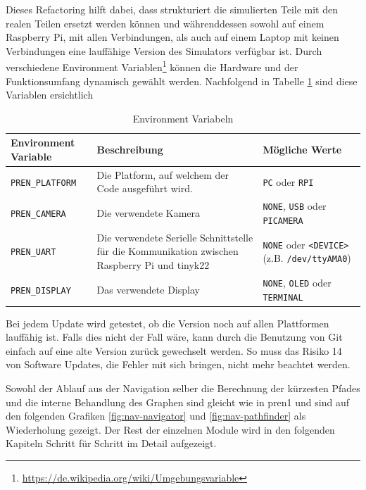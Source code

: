 Dieses Refactoring hilft dabei, dass strukturiert die simulierten Teile mit den realen Teilen ersetzt werden können und währenddessen sowohl auf einem Raspberry Pi, mit allen Verbindungen, als auch auf einem Laptop mit keinen Verbindungen eine lauffähige Version des Simulators verfügbar ist.
Durch verschiedene Environment Variablen\footnote{\url{https://de.wikipedia.org/wiki/Umgebungsvariable}} können die Hardware und der Funktionsumfang dynamisch gewählt werden. Nachfolgend in Tabelle \ref{table:environment-variables} sind diese Variablen ersichtlich


\begin{table}[H]
    \centering
    \begin{tabularx}{\textwidth}{|X|X|X|}
    \hline
        \textbf{Environment Variable} & \textbf{Beschreibung} & \textbf{Mögliche Werte}\\
        \hline
         \verb|PREN_PLATFORM| & Die Platform, auf welchem der Code ausgeführt wird. & \verb|PC| oder \verb|RPI| \\
         \hline
         \verb|PREN_CAMERA| & Die verwendete Kamera & \verb|NONE|, \verb|USB| oder \verb|PICAMERA| \\
         \hline
         \verb|PREN_UART| & Die verwendete Serielle Schnittstelle für die Kommunikation zwischen Raspberry Pi und \gls{tinyk22} & \verb|NONE| oder \verb|<DEVICE>| \newline (z.B. \verb|/dev/ttyAMA0|) \\
         \hline
         \verb|PREN_DISPLAY| & Das verwendete Display &  \verb|NONE|, \verb|OLED| oder \verb|TERMINAL|  \\
         \hline
    \end{tabularx}
    \caption{Environment Variabeln}
    \label{table:environment-variables}
\end{table}

Bei jedem Update wird getestet, ob die Version noch auf allen Plattformen lauffähig ist. Falls dies nicht der Fall wäre, kann durch die Benutzung von Git einfach auf eine alte Version zurück gewechselt werden. So muss das Risiko 14 von Software Updates, die Fehler mit sich bringen, nicht mehr beachtet werden.

Sowohl der Ablauf aus der Navigation selber die Berechnung der kürzesten Pfades und die interne Behandlung des Graphen sind gleicht wie in \acrshort{pren1} und sind auf den folgenden Grafiken \ref{fig:nav-navigator} und \ref{fig:nav-pathfinder} als Wiederholung gezeigt. Der Rest der einzelnen Module wird in den folgenden Kapiteln Schritt für Schritt im Detail aufgezeigt.

